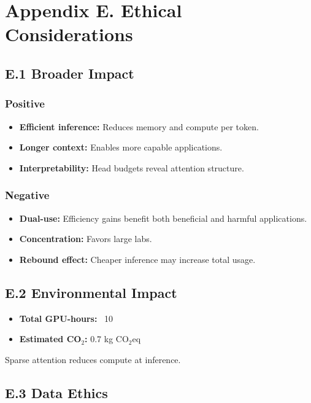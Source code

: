 
\section{Appendix E. Ethical Considerations}

\subsection{E.1 Broader Impact}

\subsubsection{Positive}
\begin{itemize}
\item \textbf{Efficient inference:} Reduces memory and compute per token.
\item \textbf{Longer context:} Enables more capable applications.
\item \textbf{Interpretability:} Head budgets reveal attention structure.

\end{itemize}
\subsubsection{Negative}
\begin{itemize}
\item \textbf{Dual-use:} Efficiency gains benefit both beneficial and harmful
  applications.
\item \textbf{Concentration:} Favors large labs.
\item \textbf{Rebound effect:} Cheaper inference may increase total usage.

\end{itemize}
\subsection{E.2 Environmental Impact}

\begin{itemize}
\item \textbf{Total GPU-hours:} ~10
\item \textbf{Estimated CO$_2$:} 0.7 kg CO$_2$eq

\end{itemize}
Sparse attention reduces compute at inference.

\subsection{E.3 Data Ethics}


